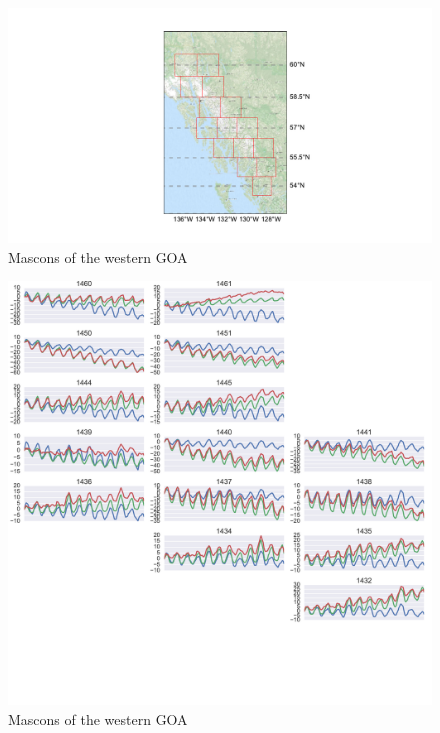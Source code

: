 \documentclass[review]{igs}
\begin{document}
\begin{figure}
\noindent\includegraphics[width=178mm]{figures/southeasternMap} \centering \caption{Mascons of the western GOA} \label{fig:summer}
\end{figure}

\begin{figure}
\noindent\includegraphics[width=178mm]{figures/southeasternPlot} \centering \caption{Mascons of the western GOA} \label{fig:summer}
\end{figure}

\end{document}
